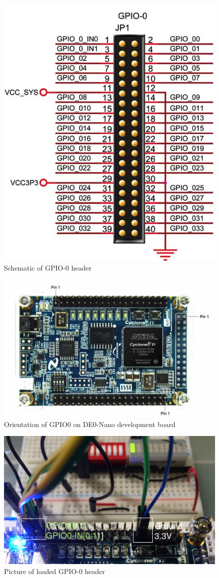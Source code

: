 \documentclass[12pt,journal]{IEEEtran}
\begin{document}
      \begin{figure}[H]
        \includegraphics[width=.48\textwidth]{Images/GPIOHeader.jpg}
        \caption{Schematic of GPIO-0 header\cite{DE0Manual}}
      \end{figure}

      \begin{figure}[H]
        \includegraphics[width=.6\textwidth, angle=270]{Images/LabeledGPIOHeaders.jpg}
        \caption{Orientation of GPIO0 on DE0-Nano development board\cite{DE0Manual}}
      \end{figure}

      \begin{figure}[H]
        \includegraphics[width=.48\textwidth]{Images/GPIOpicture.jpg}
        \caption{Picture of loaded GPIO-0 header}
      \end{figure}
\end{document}
